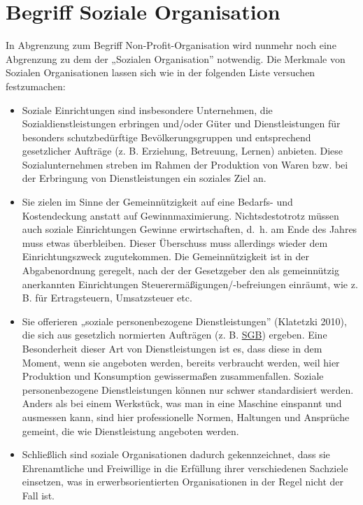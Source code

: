 \documentclass[
  letterpaper,
]{book}
\begin{document}
\section{Begriff Soziale
Organisation}\label{begriff-soziale-organisation}

In Abgrenzung zum Begriff Non-Profit-Organisation wird nunmehr noch eine
Abgrenzung zu dem der „Sozialen Organisation'' notwendig. Die Merkmale
von Sozialen Organisationen lassen sich wie in der folgenden Liste
versuchen festzumachen:

\begin{itemize}
\item
  Soziale Einrichtungen sind insbesondere Unternehmen, die
  Sozialdienstleistungen erbringen und/oder Güter und Dienstleistungen
  für besonders schutzbedürftige Bevölkerungsgruppen und entsprechend
  gesetzlicher Aufträge (z. B. Erziehung, Betreuung, Lernen) anbieten.
  Diese Sozialunternehmen streben im Rahmen der Produktion von Waren
  bzw. bei der Erbringung von Dienstleistungen ein soziales Ziel an.
\item
  Sie zielen im Sinne der Gemeinnützigkeit auf eine Bedarfs- und
  Kostendeckung anstatt auf Gewinnmaximierung. Nichtsdestotrotz müssen
  auch soziale Einrichtungen Gewinne erwirtschaften, d.~h. am Ende des
  Jahres muss etwas überbleiben. Dieser Überschuss muss allerdings
  wieder dem Einrichtungszweck zugutekommen. Die Gemeinnützigkeit ist in
  der Abgabenordnung geregelt, nach der der Gesetzgeber den als
  gemeinnützig anerkannten Einrichtungen Steuerermäßigungen/-befreiungen
  einräumt, wie z. B. für Ertragsteuern, Umsatzsteuer etc.
\item
  Sie offerieren „soziale personenbezogene Dienstleistungen'' (Klatetzki
  2010), die sich aus gesetzlich normierten Aufträgen (z. B.
  \href{https://www.bpb.de/kurz-knapp/lexika/politiklexikon/18231/sozialgesetzbuch-sgb/}{SGB})
  ergeben. Eine Besonderheit dieser Art von Dienstleistungen ist es,
  dass diese in dem Moment, wenn sie angeboten werden, bereits
  verbraucht werden, weil hier Produktion und Konsumption gewissermaßen
  zusammenfallen. Soziale personenbezogene Dienstleistungen können nur
  schwer standardisiert werden. Anders als bei einem Werkstück, was man
  in eine Maschine einspannt und ausmessen kann, sind hier
  professionelle Normen, Haltungen und Ansprüche gemeint, die wie
  Dienstleistung angeboten werden.
\item
  Schließlich sind soziale Organisationen dadurch gekennzeichnet, dass
  sie Ehrenamtliche und Freiwillige in die Erfüllung ihrer verschiedenen
  Sachziele einsetzen, was in erwerbsorientierten Organisationen in der
  Regel nicht der Fall ist.
\end{itemize}
\end{document}
